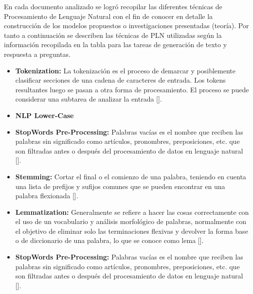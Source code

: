 \documentclass[../Main.tex]{subfiles}
\begin{document}
\begin{justify}
En cada documento analizado se logró recopilar las diferentes técnicas de Procesamiento de Lenguaje Natural con el fin de conocer en detalle la construcción de los modelos propuestos o investigaciones presentadas (teoría). Por tanto a continuación se describen las técnicas de PLN utilizadas según la información recopilada en la tabla para las tareas de generación de texto y respuesta a preguntas.
\end{justify}

\begin{itemize}
	\item \textbf{Tokenization:} La tokenización es el proceso de demarcar y posiblemente clasificar secciones de una cadena de caracteres de entrada. Los tokens resultantes luego se pasan a otra forma de procesamiento. El proceso se puede considerar una subtarea de analizar la entrada [].\par

	\item \textbf{NLP Lower-Case}\par

	\item \textbf{StopWords Pre-Processing:} Palabras vacías es el nombre que reciben las palabras sin significado como artículos, pronombres, preposiciones, etc. que son filtradas antes o después del procesamiento de datos en lenguaje natural []. \par

    \item \textbf{Stemming:} Cortar el final o el comienzo de una palabra, teniendo en cuenta una lista de prefijos y sufijos comunes que se pueden encontrar en una palabra flexionada []. \par
    
    \item \textbf{Lemmatization:} Generalmente se refiere a hacer las cosas correctamente con el uso de un vocabulario y análisis morfológico de palabras, normalmente con el objetivo de eliminar solo las terminaciones flexivas y devolver la forma base o de diccionario de una palabra, lo que se conoce como lema []. \par
    
    \item \textbf{StopWords Pre-Processing:} Palabras vacías es el nombre que reciben las palabras sin significado como artículos, pronombres, preposiciones, etc. que son filtradas antes o después del procesamiento de datos en lenguaje natural []. \par
    

\end{itemize}
\end{document}
